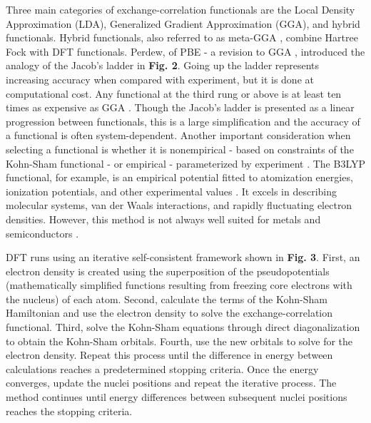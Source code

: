 \documentclass[3p,review,12pt]{elsarticle}
\begin{document}
Three main categories of exchange-correlation functionals are the Local Density Approximation (LDA), Generalized Gradient Approximation (GGA), and hybrid functionals. Hybrid functionals, also referred to as meta-GGA , combine Hartree Fock with DFT functionals. Perdew, of PBE - a revision to GGA \cite{Perdew1996}, introduced the analogy of the Jacob's ladder in \textbf{Fig. 2}. Going up the ladder represents increasing accuracy when compared with experiment, but it is done at computational cost. Any functional at the third rung or above is at least ten times as expensive as GGA \cite{Lee2012}. Though the Jacob's ladder is presented as a linear progression between functionals, this is a large simplification and the accuracy of a functional is often system-dependent. Another important consideration when selecting a functional is whether it is nonempirical - based on constraints of the Kohn-Sham functional - or empirical - parameterized by experiment \cite{Sholl2009}. The B3LYP functional, for example, is an empirical potential fitted to atomization energies, ionization potentials, and other experimental values \cite{Lee2012}. It excels in describing molecular systems, van der Waals interactions, and rapidly fluctuating electron densities. However, this method is not always well suited for metals and semiconductors \cite{Paier2007}.
\par 

DFT runs using an iterative self-consistent framework shown in\textbf{ Fig. 3}. First, an electron density is created using the superposition of the pseudopotentials (mathematically simplified functions resulting from freezing core electrons with the nucleus) of each atom. Second, calculate the terms of the Kohn-Sham Hamiltonian and use the electron density to solve the exchange-correlation functional.  Third, solve the Kohn-Sham equations through direct diagonalization to obtain the Kohn-Sham orbitals. Fourth, use the new orbitals to solve for the electron density. Repeat this process until the difference in energy between calculations reaches a predetermined stopping criteria. Once the energy converges, update the nuclei positions and repeat the iterative process. The method continues until energy differences between subsequent nuclei positions reaches the stopping criteria. 
\end{document}
